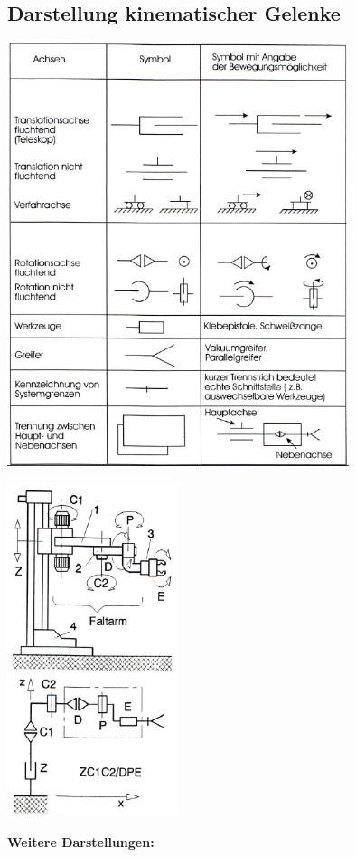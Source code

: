 	\subsection{Darstellung kinematischer Gelenke }
    \enlargethispage{1cm}
\begin{minipage}{10cm}
	\includegraphics[width=10cm]{./bilder/symbole}
\end{minipage}
\begin{minipage}{5.1cm}
	\includegraphics[width=5cm]{./bilder/symbole-bsp}
\end{minipage}
\begin{minipage}{0.2\linewidth}
    \textbf{Weitere Darstellungen:}\newline
    \newline
    \newline
    \newline
    \newline
    \newline
\end{minipage}


